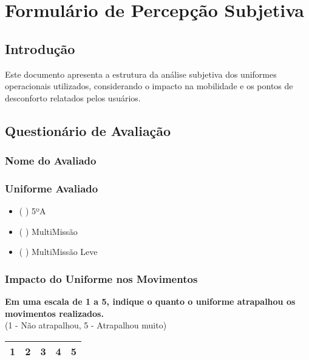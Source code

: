 \chapter{Formulário de Percepção Subjetiva}
\label{ap:formulario}
\section{Introdução}
Este documento apresenta a estrutura da análise subjetiva dos uniformes operacionais utilizados, considerando o impacto na mobilidade e os pontos de desconforto relatados pelos usuários.

\section{Questionário de Avaliação}

\subsection{Nome do Avaliado}
\vspace{2cm}
\subsection{Uniforme Avaliado}

    \begin{itemize}
        \item ( ) 5ºA
        \item ( ) MultiMissão
        \item ( ) MultiMissão Leve
    \end{itemize}


\subsection{Impacto do Uniforme nos Movimentos}
\textbf{Em uma escala de 1 a 5, indique o quanto o uniforme atrapalhou os movimentos realizados.}\\
(1 - Não atrapalhou, 5 - Atrapalhou muito)

\begin{center}
    \begin{tabular}{|c|c|c|c|c|}
        \hline
        1 & 2 & 3 & 4 & 5 \\
        \hline
    \end{tabular}
\end{center}

